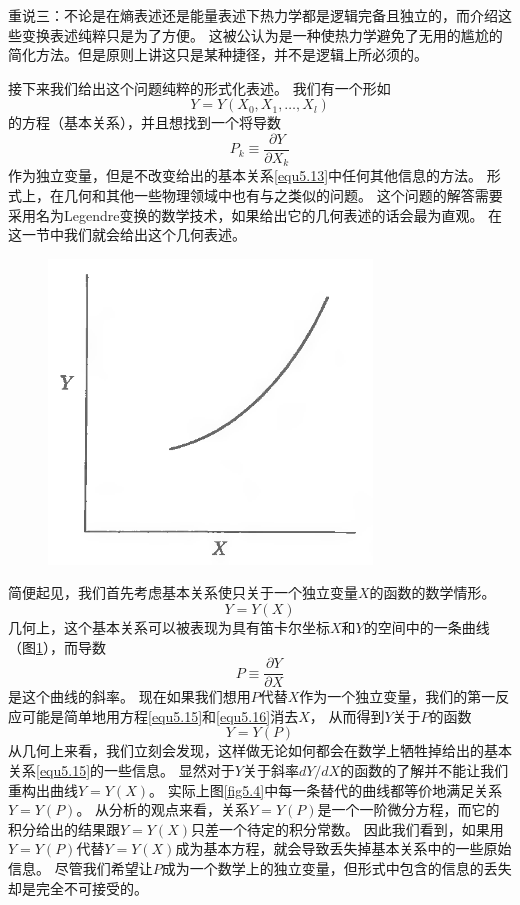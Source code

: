 重说三：不论是在熵表述还是能量表述下热力学都是逻辑完备且独立的，而介绍这些变换表述纯粹只是为了方便。
这被公认为是一种使热力学避免了无用的尴尬的简化方法。但是原则上讲这只是某种捷径，并不是逻辑上所必须的。

接下来我们给出这个问题纯粹的形式化表述。
我们有一个形如
\begin{equation}
\label{equ5.13}
  Y=Y(X_0,X_1,\ldots,X_l)
\end{equation}
的方程（基本关系），并且想找到一个将导数
\begin{equation}
\label{equ5.14}
  P_k\equiv\frac{\partial Y}{\partial X_k}
\end{equation}
作为独立变量，但是不改变给出的基本关系\eqref{equ5.13}中任何其他信息的方法。
形式上，在几何和其他一些物理领域中也有与之类似的问题。
这个问题的解答需要采用名为Legendre变换的数学技术，如果给出它的几何表述的话会最为直观。
在这一节中我们就会给出这个几何表述。

\begin{figure}[htbp]
\includegraphics[width=.5\textwidth]{Pictures/fig5.3.png}
\figcaption{}
\label{fig5.3}
\end{figure}

简便起见，我们首先考虑基本关系使只关于一个独立变量$X$的函数的数学情形。
\begin{equation}
\label{equ5.15}
  Y=Y(X)
\end{equation}
几何上，这个基本关系可以被表现为具有笛卡尔坐标$X$和$Y$的空间中的一条曲线（图\ref{fig5.3}），而导数
\begin{equation}
\label{equ5.16}
  P\equiv\frac{\partial Y}{\partial X}
\end{equation}
是这个曲线的斜率。
现在如果我们想用$P$代替$X$作为一个独立变量，我们的第一反应可能是简单地用方程\eqref{equ5.15}和\eqref{equ5.16}消去$X$，
从而得到$Y$关于$P$的函数
\begin{equation}
\label{equ5.17}
  Y=Y(P)
\end{equation}
从几何上来看，我们立刻会发现，这样做无论如何都会在数学上牺牲掉给出的基本关系\eqref{equ5.15}的一些信息。
显然对于$Y$关于斜率$dY/dX$的函数的了解并不能让我们重构出曲线$Y=Y(X)$。
实际上图\ref{fig5.4}中每一条替代的曲线都等价地满足关系$Y=Y(P)$。
从分析的观点来看，关系$Y=Y(P)$是一个一阶微分方程，而它的积分给出的结果跟$Y=Y(X)$只差一个待定的积分常数。
因此我们看到，如果用$Y=Y(P)$代替$Y=Y(X)$成为基本方程，就会导致丢失掉基本关系中的一些原始信息。
尽管我们希望让$P$成为一个数学上的独立变量，但形式中包含的信息的丢失却是完全不可接受的。

